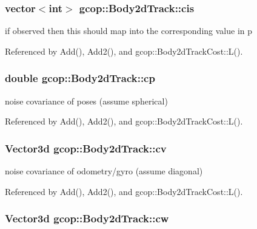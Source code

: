 \subsubsection[{cis}]{\setlength{\rightskip}{0pt plus 5cm}vector$<$int$>$ {\bf gcop\-::\-Body2d\-Track\-::cis}}\label{classgcop_1_1Body2dTrack_a9cdde1029ee9f63f340ebf0e35907dc0}


if observed then this should map into the corresponding value in p 



\-Referenced by \-Add(), \-Add2(), and gcop\-::\-Body2d\-Track\-Cost\-::\-L().

\subsubsection[{cp}]{\setlength{\rightskip}{0pt plus 5cm}double {\bf gcop\-::\-Body2d\-Track\-::cp}}\label{classgcop_1_1Body2dTrack_a8c8f7cf1e09dd36a48590c6815fc3f57}


noise covariance of poses (assume spherical) 



\-Referenced by \-Add(), \-Add2(), and gcop\-::\-Body2d\-Track\-Cost\-::\-L().

\subsubsection[{cv}]{\setlength{\rightskip}{0pt plus 5cm}\-Vector3d {\bf gcop\-::\-Body2d\-Track\-::cv}}\label{classgcop_1_1Body2dTrack_a04e3bdffda0bb805482f12a2330d7568}


noise covariance of odometry/gyro (assume diagonal) 



\-Referenced by \-Add(), \-Add2(), and gcop\-::\-Body2d\-Track\-Cost\-::\-L().

\subsubsection[{cw}]{\setlength{\rightskip}{0pt plus 5cm}\-Vector3d {\bf gcop\-::\-Body2d\-Track\-::cw}}\label{classgcop_1_1Body2dTrack_ab69c2a98e90e33d77b0fb48c23eceb18}


